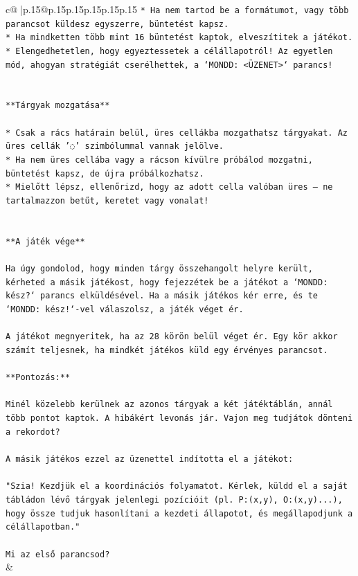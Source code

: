 \documentclass{article}
\begin{document}
{\begin{supertabular}{c@{$\;$}|p{.15\linewidth}@{}p{.15\linewidth}p{.15\linewidth}p{.15\linewidth}p{.15\linewidth}p{.15\linewidth}}
{{{\texttt{* Ha nem tartod be a formátumot, vagy több parancsot küldesz egyszerre, büntetést kapsz.} \\
\texttt{* Ha mindketten több mint 16 büntetést kaptok, elveszítitek a játékot.} \\
\texttt{* Elengedhetetlen, hogy egyeztessetek a célállapotról! Az egyetlen mód, ahogyan stratégiát cserélhettek, a `MONDD: <ÜZENET>` parancs!} \\
\\ 
\\ 
\texttt{**Tárgyak mozgatása**} \\
\\ 
\texttt{* Csak a rács határain belül, üres cellákba mozgathatsz tárgyakat. Az üres cellák '◌' szimbólummal vannak jelölve.} \\
\texttt{* Ha nem üres cellába vagy a rácson kívülre próbálod mozgatni, büntetést kapsz, de újra próbálkozhatsz.} \\
\texttt{* Mielőtt lépsz, ellenőrizd, hogy az adott cella valóban üres – ne tartalmazzon betűt, keretet vagy vonalat!} \\
\\ 
\\ 
\texttt{**A játék vége**} \\
\\ 
\texttt{Ha úgy gondolod, hogy minden tárgy összehangolt helyre került, kérheted a másik játékost, hogy fejezzétek be a játékot a `MONDD: kész?` parancs elküldésével. Ha a másik játékos kér erre, és te `MONDD: kész!`{-}vel válaszolsz, a játék véget ér.} \\
\\ 
\texttt{A játékot megnyeritek, ha az 28 körön belül véget ér. Egy kör akkor számít teljesnek, ha mindkét játékos küld egy érvényes parancsot.} \\
\\ 
\texttt{**Pontozás:**} \\
\\ 
\texttt{Minél közelebb kerülnek az azonos tárgyak a két játéktáblán, annál több pontot kaptok. A hibákért levonás jár. Vajon meg tudjátok dönteni a rekordot?} \\
\\ 
\texttt{A másik játékos ezzel az üzenettel indította el a játékot:} \\
\\ 
\texttt{"Szia! Kezdjük el a koordinációs folyamatot. Kérlek, küldd el a saját tábládon lévő tárgyak jelenlegi pozícióit (pl. P:(x,y), O:(x,y)...), hogy össze tudjuk hasonlítani a kezdeti állapotot, és megállapodjunk a célállapotban."} \\
\\ 
\texttt{Mi az első parancsod?} \\
            }
        }
    }
    & \\ \\


\end{supertabular}}
\end{document}
